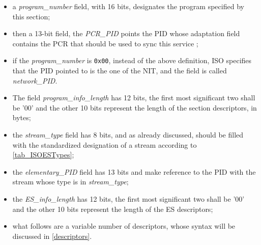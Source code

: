 \documentclass[
	12pt,				%
	openright,			%
	twoside,			%
	a4paper,			%
	brazil,
	french,				%
	english
	]{abntex2}
\begin{document}
\begin{itemize}
\item{a \textit{program\hspace{0.1mm}\_\hspace{0.1mm}number} field, with 16 bits, designates the program specified by this section;}
\item{then a 13-bit field, the \textit{PCR\hspace{0.1mm}\_\hspace{0.1mm}PID} points the PID whose adaptation field contains the PCR that should be used to sync this service ;}
\item{if the \textit{program\hspace{0.1mm}\_\hspace{0.1mm}number} is \texttt{0x00}, instead of the above definition, ISO specifies that the PID pointed to is the one of the NIT, and the field is called \textit{network\hspace{0.1mm}\_\hspace{0.1mm}PID}.}
\item{The field \textit{program\hspace{0.1mm}\_\hspace{0.1mm}info\hspace{0.1mm}\_\hspace{0.1mm}length} has 12 bits, the first most significant two shall be '00' and the other 10 bits represent the length of the section descriptors, in bytes;}
\item{the \textit{stream\hspace{0.1mm}\_\hspace{0.1mm}type} field has 8 bits, and as already discussed, should be filled with the standardized designation of a stream according to \autoref{tab_ISOESTypes};}
\item{the \textit{elementary\hspace{0.1mm}\_\hspace{0.1mm}PID} field has 13 bits and make reference to the PID with the stream whose type is in \textit{stream\hspace{0.1mm}\_\hspace{0.1mm}type};}
\item{the \textit{ES\hspace{0.1mm}\_\hspace{0.1mm}info\hspace{0.1mm}\_\hspace{0.1mm}length} has 12 bits, the first most significant two shall be '00' and the other 10 bits represent the length of the ES descriptors;}
\item{what follows are a variable number of descriptors, whose syntax will be discussed in \autoref{descriptors}.}
\end{itemize}
\end{document}
